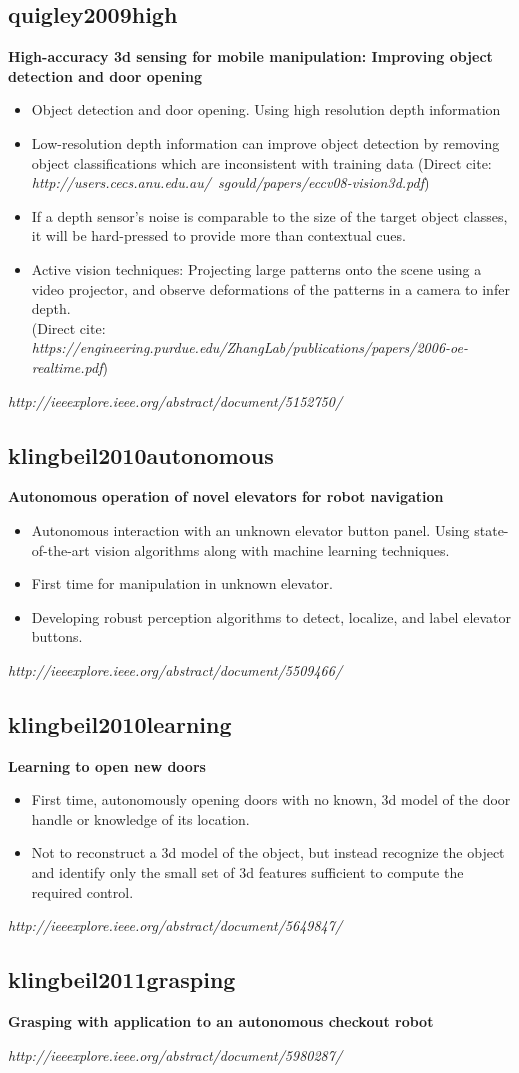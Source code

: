 \subsection{quigley2009high}
\textbf{High-accuracy 3d sensing for mobile manipulation: Improving object detection and door opening}
\begin{itemize}
\item Object detection and door opening. Using high resolution depth information 
\item Low-resolution depth information can improve object detection by removing object classifications which are inconsistent with training data
(Direct cite: \textit{http://users.cecs.anu.edu.au/~sgould/papers/eccv08-vision3d.pdf})
\item If a depth sensor's noise is comparable to the size of the target object classes, it will be hard-pressed to provide more than contextual cues. 
\item Active vision techniques: Projecting large patterns onto the scene using a video projector, and observe deformations of the patterns in a camera to infer depth. \\
(Direct cite: \textit{https://engineering.purdue.edu/ZhangLab/publications/papers/2006-oe-realtime.pdf})
\end{itemize}
\textit{http://ieeexplore.ieee.org/abstract/document/5152750/}



\subsection{klingbeil2010autonomous}
\textbf{Autonomous operation of novel elevators for robot navigation}
\begin{itemize}
\item Autonomous interaction with an unknown elevator button panel. Using state-of-the-art vision algorithms along with machine learning techniques.  
\item First time for manipulation in unknown elevator. 
\item Developing robust perception algorithms to detect, localize, and label elevator buttons. 
\end{itemize}
\textit{http://ieeexplore.ieee.org/abstract/document/5509466/}



\subsection{klingbeil2010learning}
\textbf{Learning to open new doors}
\begin{itemize}
\item First time, autonomously opening doors with no known, 3d model of the door handle or knowledge of its location. 
\item Not to reconstruct a 3d model of the object, but instead recognize the object and identify only the small set of 3d features sufficient to compute the required control. 
\end{itemize}
\textit{http://ieeexplore.ieee.org/abstract/document/5649847/}



\subsection{klingbeil2011grasping}
\textbf{Grasping with application to an autonomous checkout robot}

\textit{http://ieeexplore.ieee.org/abstract/document/5980287/}